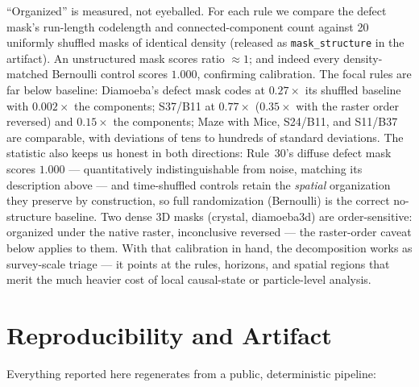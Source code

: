 \documentclass[letterpaper]{article}
\begin{document}
``Organized'' is measured, not eyeballed. For each rule we compare the
defect mask's run-length codelength and connected-component count
against 20 uniformly shuffled masks of identical density (released as
\texttt{mask\_structure} in the artifact). An unstructured mask scores
ratio $\approx 1$; and indeed every density-matched Bernoulli control
scores $1.000$, confirming calibration. The focal rules are far below
baseline: Diamoeba's defect mask codes at $0.27\times$ its shuffled
baseline with $0.002\times$ the components; S37/B11 at $0.77\times$
($0.35\times$ with the raster order reversed) and $0.15\times$ the
components; Maze with Mice, S24/B11, and S11/B37 are comparable, with
deviations of tens to hundreds of standard deviations. The statistic
also keeps us honest in both directions: Rule~30's diffuse defect mask
scores $1.000$ --- quantitatively indistinguishable from noise, matching
its description above --- and time-shuffled controls retain the
\emph{spatial} organization they preserve by construction, so full
randomization (Bernoulli) is the correct no-structure baseline. Two
dense 3D masks (crystal, diamoeba3d) are order-sensitive: organized
under the native raster, inconclusive reversed --- the raster-order
caveat below applies to them. With that calibration in hand, the
decomposition works as survey-scale triage --- it points at the rules,
horizons, and spatial regions that merit the much heavier cost of local
causal-state or particle-level analysis.

\section{Reproducibility and Artifact}
\label{sec:artifact}

Everything reported here regenerates from a public, deterministic
pipeline:
\end{document}
